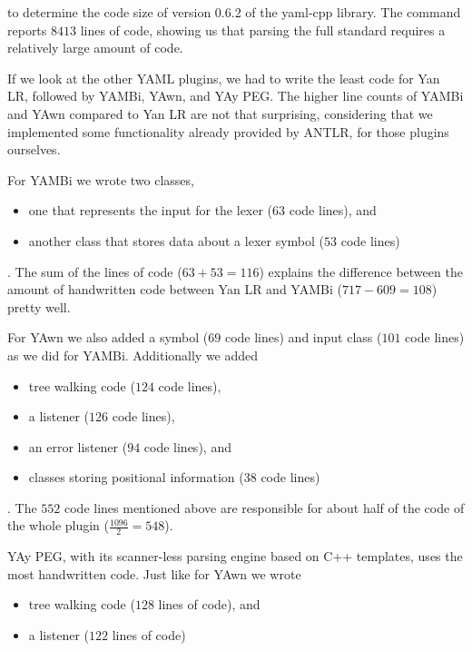 to determine the code size of version 0.6.2 of the yaml-cpp library. The command reports $8413$ lines of code, showing us that parsing the full  standard requires a relatively large amount of code.

If we look at the other YAML plugins, we had to write the least code for Yan LR, followed by YAMBi, YAwn, and YAy PEG. The higher line counts of YAMBi and YAwn compared to Yan LR are not that surprising, considering that we implemented some functionality already provided by ANTLR, for those plugins ourselves.

For YAMBi we wrote two classes,

\begin{itemize}
  \item one that represents the input for the lexer ($63$ code lines), and
  \item another class that stores data about a lexer symbol ($53$ code lines)
\end{itemize}

. The sum of the lines of code ($63 + 53 = 116$) explains the difference between the amount of handwritten code between Yan LR and YAMBi ($717 - 609 = 108$) pretty well.

For YAwn we also added a symbol ($69$ code lines) and input class ($101$ code lines) as we did for YAMBi. Additionally we added

\begin{itemize}
  \item tree walking code ($124$ code lines),
  \item a listener ($126$ code lines),
  \item an error listener ($94$ code lines), and
  \item classes storing positional information ($38$ code lines)
\end{itemize}

. The $552$ code lines mentioned above are responsible for about half of the code of the whole plugin ($\frac{1096}{2} = 548$).

YAy PEG, with its scanner-less parsing engine based on C++ templates, uses the most handwritten code. Just like for YAwn we wrote

\begin{itemize}
  \item tree walking code ($128$ lines of code), and
  \item a listener ($122$ lines of code)
\end{itemize}

